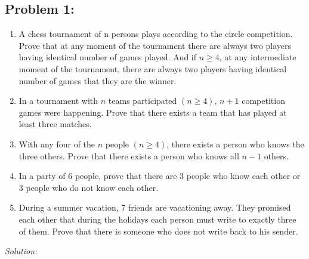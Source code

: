 \documentclass[a4paper]{article}
\begin{document}
	\subsection*{Problem 1:}
	\begin{enumerate}
		\item A chess tournament of n persons plays according to the circle competition. Prove that at any moment of the tournament there are always two players having identical number of games played. And if $n \geq 4$, at any intermediate moment of the tournament, there are always two players having identical number of games that they are the winner.
		\item In a tournament with $n$ teams participated $(n \geq 4)$, $n + 1$ competition games were happening. Prove that there exists a team that has played at least three matches.
		\item With any four of the $n$ people $(n \geq 4)$, there exists a person who knows the three others. Prove that there exists a person who knows all $n -1$ others.
		\item In a party of 6 people, prove that there are 3 people who know each other or 3 people who do not know each other.
		\item During a summer vacation, 7 friends are vacationing away. They promised each other that during the holidays each person must write to exactly three of them. Prove that there is someone who does not write back to his sender.
	\end{enumerate}
	\textit{Solution:} \\
\end{document}
